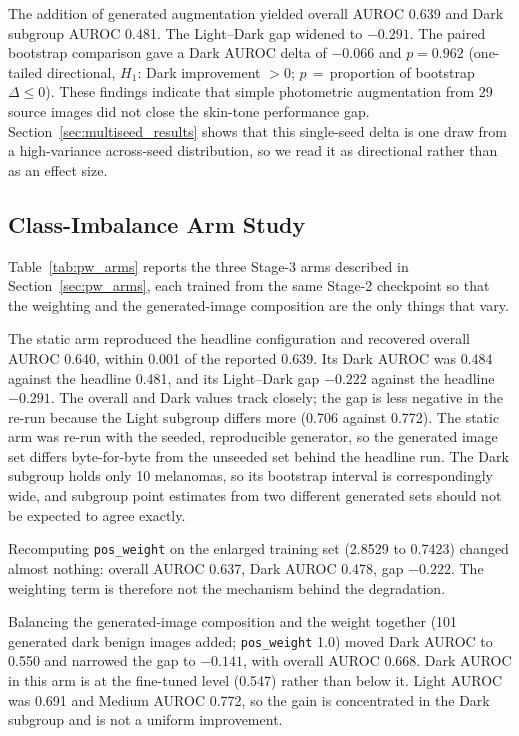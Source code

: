 The addition of generated augmentation yielded overall AUROC 0.639 and Dark subgroup AUROC 0.481. The Light--Dark gap widened to $-0.291$. The paired bootstrap comparison gave a Dark AUROC delta of $-0.066$ and $p=0.962$ (one-tailed directional, $H_1$: Dark improvement $>0$; $p$\,$=$\,proportion of bootstrap $\Delta \leq 0$). These findings indicate that simple photometric augmentation from 29 source images did not close the skin-tone performance gap. Section~\ref{sec:multiseed_results} shows that this single-seed delta is one draw from a high-variance across-seed distribution, so we read it as directional rather than as an effect size.

\subsection{Class-Imbalance Arm Study}
\label{sec:pw_arms_results}

Table~\ref{tab:pw_arms} reports the three Stage-3 arms described in Section~\ref{sec:pw_arms}, each trained from the same Stage-2 checkpoint so that the weighting and the generated-image composition are the only things that vary.

The static arm reproduced the headline configuration and recovered overall AUROC 0.640, within 0.001 of the reported 0.639. Its Dark AUROC was 0.484 against the headline 0.481, and its Light--Dark gap $-0.222$ against the headline $-0.291$. The overall and Dark values track closely; the gap is less negative in the re-run because the Light subgroup differs more (0.706 against 0.772). The static arm was re-run with the seeded, reproducible generator, so the generated image set differs byte-for-byte from the unseeded set behind the headline run. The Dark subgroup holds only 10 melanomas, so its bootstrap interval is correspondingly wide, and subgroup point estimates from two different generated sets should not be expected to agree exactly.

Recomputing \texttt{pos\_weight} on the enlarged training set (2.8529 to 0.7423) changed almost nothing: overall AUROC 0.637, Dark AUROC 0.478, gap $-0.222$. The weighting term is therefore not the mechanism behind the degradation.

Balancing the generated-image composition and the weight together (101 generated dark benign images added; \texttt{pos\_weight} 1.0) moved Dark AUROC to 0.550 and narrowed the gap to $-0.141$, with overall AUROC 0.668. Dark AUROC in this arm is at the fine-tuned level (0.547) rather than below it. Light AUROC was 0.691 and Medium AUROC 0.772, so the gain is concentrated in the Dark subgroup and is not a uniform improvement.

